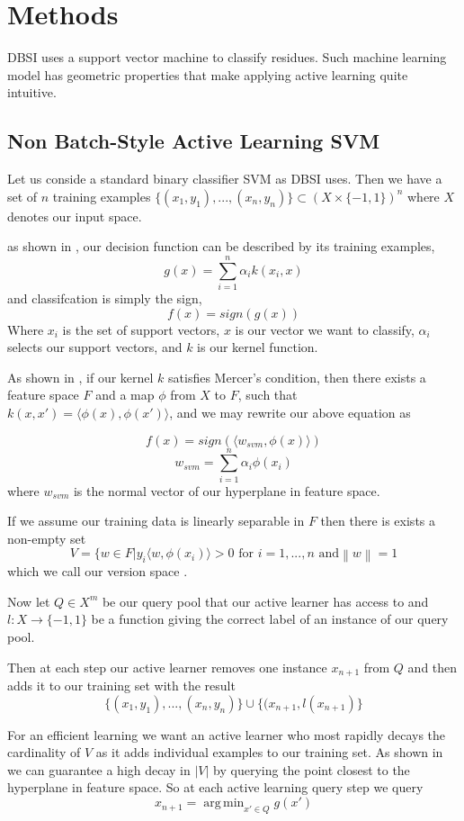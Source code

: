 \documentclass{article}
\newcommand\norm[1]{\left\lVert#1\right\rVert}
\DeclareMathOperator*{\argmin}{arg\,min}
\begin{document}
     
\section*{Methods}
DBSI uses a support vector machine to classify residues. Such machine learning model has geometric properties that make applying active learning quite intuitive. 

\subsection*{Non Batch-Style Active Learning SVM}
Let us conside a standard binary classifier SVM as DBSI uses.
Then we have a set of $n$ training examples
$
\{(x_1,y_1),...,(x_n, y_n)\} \subset (X \times \{-1,1\})^n
$ where $X$ denotes our input space. 


 as shown in \cite{svm}, our decision function can be described by its training examples,
\[
g(x) = \sum_{i=1}^{n} \alpha_i k( x_i, x)
\]
and classifcation is simply the sign,
\[
	f(x) = sign(g(x))
\]
Where $x_i$ is the set of support vectors,
$x$ is our vector we want to classify, $\alpha_i$ selects our support vectors, and $k$ is our kernel function.

As shown in \cite{active_learning}, if our kernel $k$ satisfies Mercer's condition, then there exists a feature space $F$ and a map $\phi$ from $X$ to $F$, such that $k(x,x') = \langle \phi(x) , \phi(x') \rangle$, and we may rewrite our above equation as
 
\[
f(x) = sign(\langle w_{svm}, \phi(x) \rangle)
\]
\[
w_{svm} = \sum_{i=1}^n \alpha_i \phi(x_i)
\]
where $w_{svm}$ is the normal vector of our hyperplane in feature space. 

If we assume our training data is linearly separable in $F$ then there is exists a non-empty set
\[
V = \{w \in F | y_i \langle w, \phi(x_i) \rangle > 0 \text{ for } i = 1, ...,n \text{ and} \norm{w} = 1
\]
which we call our version space \cite{version_space}.

Now let $Q \in X^m$ be our query pool that our active learner has access to and
$l : X \rightarrow \{-1,1\}$ be a function giving the correct label of an instance of our query pool.

Then at each step our active learner removes one instance $x_{n+1}$ from $Q$ and then adds it to our training set with the result
\[
\{(x_1, y_1),...,(x_n,y_n)\}\cup\{(x_{n+1}, l(x_{n+1})\}
\]


For an efficient learning we want an active learner who most rapidly decays the cardinality of $V$ as it adds individual examples to our training set. As shown in \cite{active_learning} we can guarantee a high decay in $|V|$ by querying the point closest to the hyperplane in feature space. So at each active learning query step we query
\[
x_{n+1} = \argmin_{x' \in Q} g(x')
\]
\end{document}

